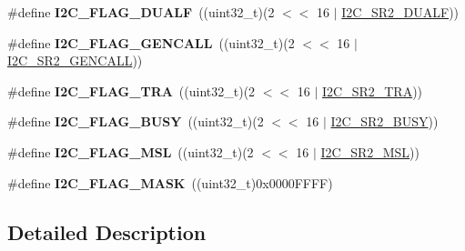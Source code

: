 \begin{DoxyCompactItemize}
\item 
\hypertarget{group___i2_c___flag__definition_ga3755b783aa73568659478c2e2e45e27f}{\#define {\bfseries I2\-C\-\_\-\-F\-L\-A\-G\-\_\-\-D\-U\-A\-L\-F}~((uint32\-\_\-t)(2 $<$$<$ 16 $\vert$ \hyperlink{group___peripheral___registers___bits___definition_ga79a6a21835e06d9bc48009f4269b7798}{I2\-C\-\_\-\-S\-R2\-\_\-\-D\-U\-A\-L\-F}))}\label{group___i2_c___flag__definition_ga3755b783aa73568659478c2e2e45e27f}

\item 
\hypertarget{group___i2_c___flag__definition_gab3a93b6840ad406c2fc09e0e96c59b88}{\#define {\bfseries I2\-C\-\_\-\-F\-L\-A\-G\-\_\-\-G\-E\-N\-C\-A\-L\-L}~((uint32\-\_\-t)(2 $<$$<$ 16 $\vert$ \hyperlink{group___peripheral___registers___bits___definition_gaf3aeb79cbe04f7ec1e3c2615921c4fab}{I2\-C\-\_\-\-S\-R2\-\_\-\-G\-E\-N\-C\-A\-L\-L}))}\label{group___i2_c___flag__definition_gab3a93b6840ad406c2fc09e0e96c59b88}

\item 
\hypertarget{group___i2_c___flag__definition_ga0359a5f960670d51cb17e659d32498ea}{\#define {\bfseries I2\-C\-\_\-\-F\-L\-A\-G\-\_\-\-T\-R\-A}~((uint32\-\_\-t)(2 $<$$<$ 16 $\vert$ \hyperlink{group___peripheral___registers___bits___definition_ga288b20416b42a79e591aa80d9a690fca}{I2\-C\-\_\-\-S\-R2\-\_\-\-T\-R\-A}))}\label{group___i2_c___flag__definition_ga0359a5f960670d51cb17e659d32498ea}

\item 
\hypertarget{group___i2_c___flag__definition_ga50f69f043d99600221076100823b6ff3}{\#define {\bfseries I2\-C\-\_\-\-F\-L\-A\-G\-\_\-\-B\-U\-S\-Y}~((uint32\-\_\-t)(2 $<$$<$ 16 $\vert$ \hyperlink{group___peripheral___registers___bits___definition_ga3b1e75a82da73ae2873cff1cd27c3179}{I2\-C\-\_\-\-S\-R2\-\_\-\-B\-U\-S\-Y}))}\label{group___i2_c___flag__definition_ga50f69f043d99600221076100823b6ff3}

\item 
\hypertarget{group___i2_c___flag__definition_gae8e6a404cbfd70420d278d520304f368}{\#define {\bfseries I2\-C\-\_\-\-F\-L\-A\-G\-\_\-\-M\-S\-L}~((uint32\-\_\-t)(2 $<$$<$ 16 $\vert$ \hyperlink{group___peripheral___registers___bits___definition_ga75cc361adf0e72e33d6771ebfa17b52d}{I2\-C\-\_\-\-S\-R2\-\_\-\-M\-S\-L}))}\label{group___i2_c___flag__definition_gae8e6a404cbfd70420d278d520304f368}

\item 
\hypertarget{group___i2_c___flag__definition_gafbc0a6e4113be03100fbae1314a8b395}{\#define {\bfseries I2\-C\-\_\-\-F\-L\-A\-G\-\_\-\-M\-A\-S\-K}~((uint32\-\_\-t)0x0000\-F\-F\-F\-F)}\label{group___i2_c___flag__definition_gafbc0a6e4113be03100fbae1314a8b395}

\end{DoxyCompactItemize}


\subsection{Detailed Description}
